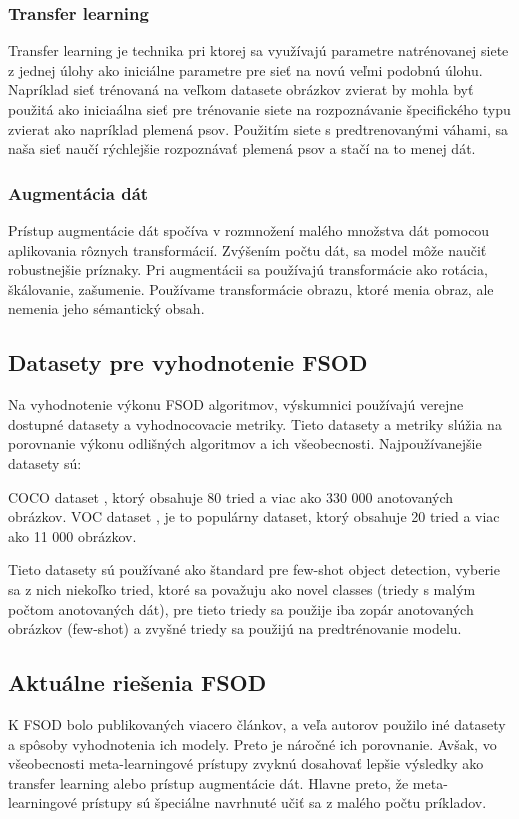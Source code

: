 \subsubsection{Transfer learning}
Transfer learning je technika pri ktorej sa využívajú parametre natrénovanej siete z jednej úlohy ako iniciálne parametre pre sieť na novú veľmi podobnú úlohu. Napríklad sieť trénovaná na veľkom datasete obrázkov zvierat by mohla byť použitá ako iniciaálna sieť pre trénovanie siete na rozpoznávanie špecifického typu zvierat ako napríklad plemená psov. Použitím siete s predtrenovanými váhami, sa naša sieť naučí rýchlejšie rozpoznávať plemená psov a stačí na to menej dát.

\subsubsection{Augmentácia dát}
Prístup augmentácie dát spočíva v rozmnožení malého množstva dát pomocou aplikovania rôznych transformácií. Zvýšením počtu dát, sa model môže naučiť robustnejšie príznaky. Pri augmentácii sa používajú transformácie ako rotácia, škálovanie, zašumenie. Používame transformácie obrazu, ktoré menia obraz, ale nemenia jeho sémantický obsah.

\subsection{Datasety pre vyhodnotenie FSOD}
Na vyhodnotenie výkonu FSOD algoritmov, výskumnici používajú verejne dostupné datasety a vyhodnocovacie metriky. Tieto datasety a metriky slúžia na porovnanie výkonu odlišných algoritmov a ich všeobecnosti. Najpoužívanejšie datasety sú: 

COCO dataset \cite{COCO}, ktorý obsahuje 80 tried a viac ako 330 000 anotovaných obrázkov. VOC dataset \cite{VOC}, je to populárny dataset, ktorý obsahuje 20 tried a viac ako 11 000 obrázkov. 

Tieto datasety sú používané ako štandard pre few-shot object detection, vyberie sa z nich niekoľko tried, ktoré sa považuju ako novel classes (triedy s malým počtom anotovaných dát), pre tieto triedy sa použije iba zopár anotovaných obrázkov (few-shot) a zvyšné triedy sa použijú na predtrénovanie modelu. 

\subsection{Aktuálne riešenia FSOD}
K FSOD bolo publikovaných viacero článkov, a veľa autorov použilo iné datasety a spôsoby vyhodnotenia ich modely. Preto je náročné ich porovnanie. Avšak, vo všeobecnosti meta-learningové prístupy zvyknú dosahovať lepšie výsledky ako transfer learning alebo prístup augmentácie dát. Hlavne preto, že meta-learningové prístupy sú špeciálne navrhnuté učiť sa z malého počtu príkladov. 

